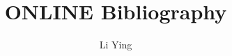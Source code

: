 \documentclass[a4paper,11pt]{article}
\author{Li Ying}
\title{ONLINE Bibliography}
\begin{document}
\maketitle

\nocite{*}

\end{document}

